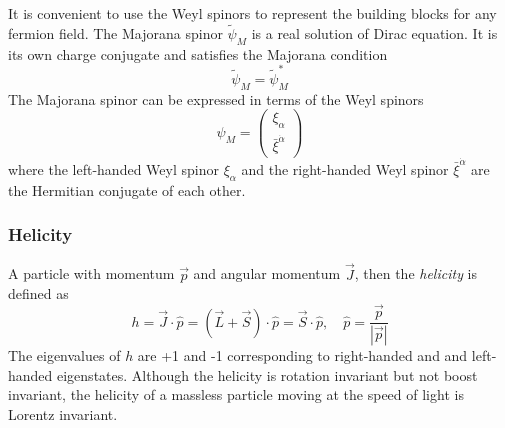 %
It is convenient to use the Weyl spinors to represent the building blocks for any fermion field.
The Majorana spinor $\tilde{\psi}_{M}$ is a real solution of Dirac equation.
It is its own charge conjugate and satisfies the Majorana condition
%
\begin{equation}
    \tilde{\psi}_{M} = \tilde{\psi}_{M}^{*}
    \label{eq:susy_majorana_condition}
\end{equation}
%
The Majorana spinor can be expressed in terms of the Weyl spinors
%
\begin{equation}
    \psi_{M} = \left(\begin{matrix}\xi_{\alpha}\\\bar{\xi}^{\dot{\alpha}}\end{matrix}\right)
    \label{eq:susy_majorana_spinor}
\end{equation}
%
where the left-handed Weyl spinor $\xi_{\alpha}$ and the right-handed Weyl spinor $\bar{\xi}^{\dot{\alpha}}$ are the Hermitian conjugate of each other.


\subsubsection{Helicity}
\label{subsubsec:susy_helicity}
A particle with momentum $\vec{p}$ and angular momentum $\vec{J}$, then the \textit{helicity} is defined as
%
\begin{equation}
    h = \vec{J} \cdot \hat{p} = (\vec{L} + \vec{S}) \cdot \hat{p} = \vec{S} \cdot \hat{p}, \quad \hat{p} = \frac{\vec{p}}{|\vec{p}|}
    \label{eq:susy_helicity}
\end{equation}
%
The eigenvalues of $h$ are +1 and -1 corresponding to right-handed and and left-handed eigenstates.
Although the helicity is rotation invariant but not boost invariant, the helicity of a massless particle moving at the speed of light is Lorentz invariant.


